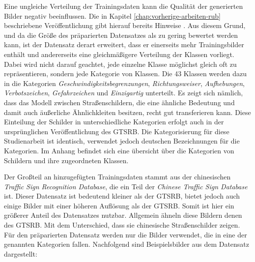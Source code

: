 Eine ungleiche Verteilung der Trainingsdaten kann die Qualität der generierten Bilder negativ beeinflussen. Die in Kapitel \ref{chap:vorherige-arbeiten-rub} beschriebene Veröffentlichung gibt hierauf bereits Hinweise \cite{gtsrbGAN}. Aus diesem Grund, und da die Größe des präparierten Datensatzes als zu gering bewertet werden kann, ist der Datensatz derart erweitert, dass er einerseits mehr Trainingsbilder enthält und andererseits eine gleichmäßigere Verteilung der Klassen vorliegt. Dabei wird nicht darauf geachtet, jede einzelne Klasse möglichst gleich oft zu repräsentieren, sondern jede Kategorie von Klassen. Die 43 Klassen werden dazu in die Kategorien \emph{Geschwindigkeitsbegrenzungen}, \emph{Richtungsweiser}, \emph{Aufhebungen}, \emph{Verbotszeichen}, \emph{Gefahrzeichen} und \emph{Einzigartig} unterteilt. Es zeigt sich nämlich, dass das Modell zwischen Straßenschildern, die eine ähnliche Bedeutung und damit auch äußerliche Ähnlichkleiten besitzen, recht gut transferieren kann. Diese Einteilung der Schilder in unterschiedliche Kategorien erfolgt auch in der ursprünglichen Veröffentlichung des \ac{GTSRB}. Die Kategorisierung für diese Studienarbeit ist identisch, verwendet jedoch deutschen Bezeichnungen für die Kategorien. Im Anhang befindet sich eine übersicht über die Kategorien von Schildern und ihre zugeordneten Klassen.

Der Großteil an hinzugefügten Trainingsdaten stammt aus der chinesischen \emph{Traffic Sign Recognition Database}, die ein Teil der \emph{Chinese Traffic Sign Database} ist. Dieser Datensatz ist bedeutend kleiner als der \ac{GTSRB}, bietet jedoch auch einige Bilder mit einer höheren Auflösung als der \ac{GTSRB}. Somit ist  hier ein größerer Anteil des Datensatzes nutzbar. Allgemein ähneln diese Bildern denen des \ac{GTSRB}. Mit dem Unterschied, dass sie chinesische Straßenschilder zeigen. Für den präparierten Datensatz werden nur die Bilder verwendet, die in eine der genannten Kategorien fallen. Nachfolgend sind Beispielsbilder aus dem Datensatz dargestellt: \cite{chinese-dataset}



